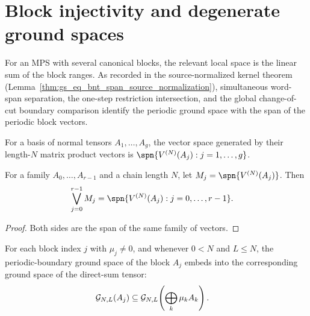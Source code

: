 \section{Block injectivity and degenerate ground spaces}\label{sec:degenerate_ground_space}

For an MPS with several canonical blocks, the relevant local space is the
linear sum of the block ranges. As recorded in the source-normalized kernel
theorem (Lemma~\ref{thm:gs_eq_bnt_span_source_normalization}), simultaneous
word-span separation, the one-step restriction intersection, and the global
change-of-cut boundary comparison identify the periodic ground space with the
span of the periodic block vectors.

\begin{definition}
    \label{def:bnt_span}
    \leanok
    For a basis of normal tensors $A_1,\ldots,A_g$, the vector space generated
    by their length-$N$ matrix product vectors is
    $\spn\{V^{(N)}(A_j):j=1,\ldots,g\}$.
\end{definition}

\begin{lemma}
    \label{lem:bnt_span_eq_sum_mpv_submodules}
    \leanok
    For a family $A_0,\ldots,A_{r-1}$ and a chain length $N$, let
    $M_j=\spn\{V^{(N)}(A_j)\}$. Then
    \begin{align}
        \bigvee_{j=0}^{r-1} M_j
         & =
        \spn\{V^{(N)}(A_j):j=0,\ldots,r-1\}.
        \notag
    \end{align}
\end{lemma}

\begin{proof}
    \leanok
    Both sides are the span of the same family of vectors.
\end{proof}


\begin{lemma}
    \label{lem:chain_ground_space_block_le_assembled}
    \leanok
    For each block index $j$ with $\mu_j\neq0$, and whenever $0<N$ and
    $L\le N$, the periodic-boundary ground space of the block $A_j$ embeds
    into the corresponding ground space of the direct-sum tensor:
    \begin{align}
        \mathcal G_{N,L}(A_j)
         & \subseteq
        \mathcal G_{N,L}\!\left(\bigoplus_k \mu_k A_k\right).
        \notag
    \end{align}
\end{lemma}

